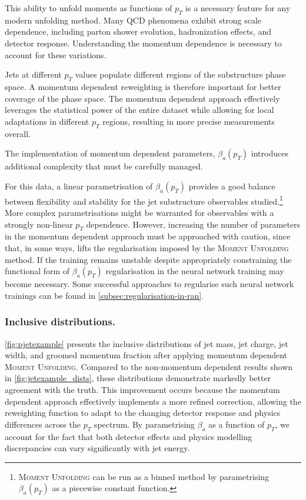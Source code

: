         This ability to unfold moments as functions of \(p_T\) is a necessary feature for any modern unfolding method.
        Many QCD phenomena exhibit strong scale dependence, including parton shower evolution, hadronization effects, and detector response.
        Understanding the momentum dependence is necessary to account for these variations.
        
        Jets at different \(p_T\) values populate different regions of the substructure phase space.
        A momentum dependent reweighting is therefore important for better coverage of the phase space.
        The momentum dependent approach effectively leverages the statistical power of the entire dataset while allowing for local adaptations in different \(p_T\) regions, resulting in more precise measurements overall.

        The implementation of momentum dependent parameters, \(\beta_a(p_T)\) introduces additional complexity that must be carefully managed.
        
        For this data, a linear parametrisation of \(\beta_a(p_T)\) provides a good balance between flexibility and stability for the jet substructure observables studied.\footnote{\textsc{Moment Unfolding} can be run as a binned method by parametrising \(\beta_a(p_T)\) as a piecewise constant function.}
        More complex parametrisations might be warranted for observables with a strongly non-linear \(p_T\) dependence.
        However, increasing the number of parameters in the momentum dependent approach must be approached with caution, since that, in some ways, lifts the regularisation imposed by the \textsc{Moment Unfolding} method.
        If the training remains unstable despite appropriately constraining the functional form of \(\beta_a(p_T)\) regularisation in the neural network training may become necessary.
        Some successful approaches to regularise such neural network trainings can be found in \cref{subsec:regularisation-in-ran}.
        
        \subsubsection{Inclusive distributions.}
            \cref{fig:pjetexample} presents the inclusive distributions of jet mass, jet charge, jet width, and groomed momentum fraction after applying momentum dependent \textsc{Moment Unfolding}.
            Compared to the non-momentum dependent results shown in \cref{fig:jetexample_dists}, these distributions demonstrate markedly better agreement with the truth.
            This improvement occurs because the momentum dependent approach effectively implements a more refined correction, allowing the reweighting function to adapt to the changing detector response and physics differences across the \(p_T\) spectrum.
            By parametrising \(\beta_a\) as a function of \(p_T\), we account for the fact that both detector effects and physics modelling discrepancies can vary significantly with jet energy.

